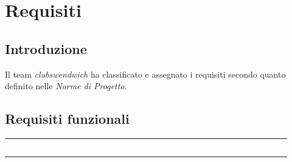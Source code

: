 \section{Requisiti}
\subsection{Introduzione}
Il team \textit{clubswendwich} ha classificato e assegnato i requisiti secondo quanto definito nelle \textit{Norme di Progetto}.
\subsection{Requisiti funzionali}
{\renewcommand{\arraystretch}{1.5}
\begin{longtable}{p{0.12\linewidth}p{0.15\linewidth}p{0.50\linewidth}p{0.15\linewidth}}
	\rowcolor[RGB]{33, 73, 50}
	\textcolor{white}{\textbf{Codice}} & \textcolor{white}{\textbf{Classe}} & \textcolor{white}{\textbf{Descrizione}} &
    \textcolor{white}{\textbf{Riferimenti}}\\
    

\end{longtable}}
